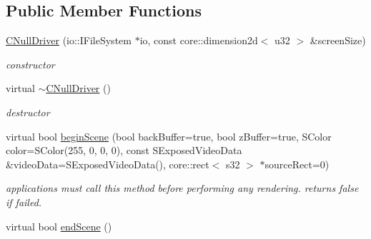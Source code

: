 \subsection*{Public Member Functions}
\begin{DoxyCompactItemize}
\item 
\hypertarget{classirr_1_1video_1_1_c_null_driver_a519e24e35260f192878e62d796d612c2}{\hyperlink{classirr_1_1video_1_1_c_null_driver_a519e24e35260f192878e62d796d612c2}{C\-Null\-Driver} (io\-::\-I\-File\-System $\ast$io, const core\-::dimension2d$<$ u32 $>$ \&screen\-Size)}\label{classirr_1_1video_1_1_c_null_driver_a519e24e35260f192878e62d796d612c2}

\begin{DoxyCompactList}\small\item\em constructor \end{DoxyCompactList}\item 
\hypertarget{classirr_1_1video_1_1_c_null_driver_a5610e7e4f5e941841903541e05b84926}{virtual \hyperlink{classirr_1_1video_1_1_c_null_driver_a5610e7e4f5e941841903541e05b84926}{$\sim$\-C\-Null\-Driver} ()}\label{classirr_1_1video_1_1_c_null_driver_a5610e7e4f5e941841903541e05b84926}

\begin{DoxyCompactList}\small\item\em destructor \end{DoxyCompactList}\item 
\hypertarget{classirr_1_1video_1_1_c_null_driver_ae64e7ad38a5fc6dc44c87f967b4c2913}{virtual bool \hyperlink{classirr_1_1video_1_1_c_null_driver_ae64e7ad38a5fc6dc44c87f967b4c2913}{begin\-Scene} (bool back\-Buffer=true, bool z\-Buffer=true, S\-Color color=S\-Color(255, 0, 0, 0), const S\-Exposed\-Video\-Data \&video\-Data=S\-Exposed\-Video\-Data(), core\-::rect$<$ s32 $>$ $\ast$source\-Rect=0)}\label{classirr_1_1video_1_1_c_null_driver_ae64e7ad38a5fc6dc44c87f967b4c2913}

\begin{DoxyCompactList}\small\item\em applications must call this method before performing any rendering. returns false if failed. \end{DoxyCompactList}\item 
\hypertarget{classirr_1_1video_1_1_c_null_driver_a67787fbd1cb81ed64762e5c42d145e69}{virtual bool \hyperlink{classirr_1_1video_1_1_c_null_driver_a67787fbd1cb81ed64762e5c42d145e69}{end\-Scene} ()}\label{classirr_1_1video_1_1_c_null_driver_a67787fbd1cb81ed64762e5c42d145e69}


\end{DoxyCompactItemize}
